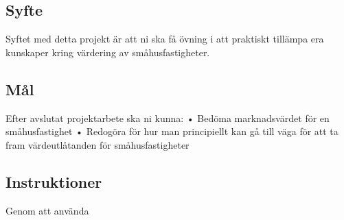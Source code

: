 \documentclass[12pt, a4paper]{article}
\begin{document}
\subsection*{Syfte}

Syftet med detta projekt är att ni ska få övning i att praktiskt tillämpa era kunskaper kring värdering av småhusfastigheter. 

\subsection*{Mål}
Efter avslutat projektarbete ska ni kunna:
•	Bedöma marknadsvärdet för en småhusfastighet
•	Redogöra för hur man principiellt kan gå till väga för att ta fram värdeutlåtanden för småhusfastigheter

\subsection*{Instruktioner}
Genom att använda
\end{document}
